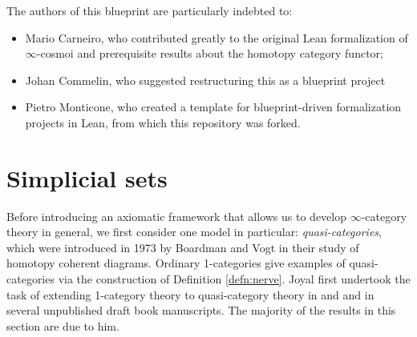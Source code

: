  The authors of this blueprint are particularly indebted to:
 \begin{itemize}
 \item Mario Carneiro, who contributed greatly to the original Lean formalization of $\infty$-cosmoi and prerequisite results about the homotopy category functor;
 \item Johan Commelin, who suggested restructuring this as a blueprint project
 \item  Pietro Monticone, who created a template for blueprint-driven formalization projects in Lean, from which this repository was forked.
 \end{itemize}

\section{Simplicial sets}\label{sec:simplicial-sets}

Before introducing an axiomatic framework that allows us to develop $\infty$-cat\-e\-gory theory in general, we first consider one model in particular:  \emph{quasi-cat\-e\-go\-ries}, which were introduced in 1973 by Boardman and Vogt  \cite{BoardmanVogt:1973hi} in their study of homotopy coherent diagrams. Ordinary 1-categories give examples of quasi-categories via the construction of Definition \ref{defn:nerve}. Joyal first undertook the task of extending 1-category theory to quasi-category theory in \cite{Joyal:2002qk} and \cite{Joyal:2008tq} and in several unpublished draft book manuscripts. The majority of the results in this section are due to him.


